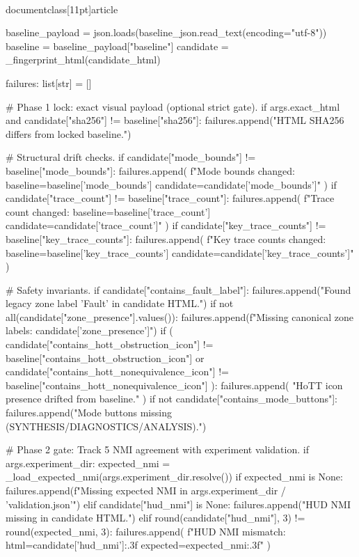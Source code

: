 \\documentclass[11pt]{article}
\begin{document}
\begin{CodeBlock}
    baseline_payload = json.loads(baseline_json.read_text(encoding="utf-8"))
    baseline = baseline_payload["baseline"]
    candidate = _fingerprint_html(candidate_html)

    failures: list[str] = []

    # Phase 1 lock: exact visual payload (optional strict gate).
    if args.exact_html and candidate["sha256"] != baseline["sha256"]:
        failures.append("HTML SHA256 differs from locked baseline.")

    # Structural drift checks.
    if candidate["mode_bounds"] != baseline["mode_bounds"]:
        failures.append(
            f"Mode bounds changed: baseline={baseline['mode_bounds']} candidate={candidate['mode_bounds']}"
        )
    if candidate["trace_count"] != baseline["trace_count"]:
        failures.append(
            f"Trace count changed: baseline={baseline['trace_count']} candidate={candidate['trace_count']}"
        )
    if candidate["key_trace_counts"] != baseline["key_trace_counts"]:
        failures.append(
            f"Key trace counts changed: baseline={baseline['key_trace_counts']} candidate={candidate['key_trace_counts']}"
        )

    # Safety invariants.
    if candidate["contains_fault_label"]:
        failures.append("Found legacy zone label 'Fault' in candidate HTML.")
    if not all(candidate["zone_presence"].values()):
        failures.append(f"Missing canonical zone labels: {candidate['zone_presence']}")
    if (
        candidate["contains_hott_obstruction_icon"] != baseline["contains_hott_obstruction_icon"]
        or candidate["contains_hott_nonequivalence_icon"] != baseline["contains_hott_nonequivalence_icon"]
    ):
        failures.append(
            "HoTT icon presence drifted from baseline."
        )
    if not candidate["contains_mode_buttons"]:
        failures.append("Mode buttons missing (SYNTHESIS/DIAGNOSTICS/ANALYSIS).")

    # Phase 2 gate: Track 5 NMI agreement with experiment validation.
    if args.experiment_dir:
        expected_nmi = _load_expected_nmi(args.experiment_dir.resolve())
        if expected_nmi is None:
            failures.append(f"Missing expected NMI in {args.experiment_dir / 'validation.json'}")
        elif candidate["hud_nmi"] is None:
            failures.append("HUD NMI missing in candidate HTML.")
        elif round(candidate["hud_nmi"], 3) != round(expected_nmi, 3):
            failures.append(
                f"HUD NMI mismatch: html={candidate['hud_nmi']:.3f} expected={expected_nmi:.3f}"
            )


\end{CodeBlock}
\end{document}
